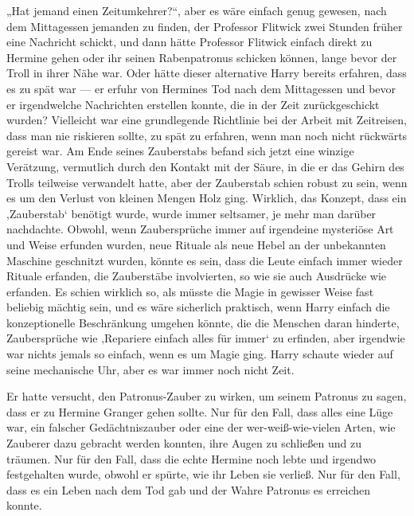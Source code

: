 „Hat jemand einen Zeitumkehrer?“, aber es wäre einfach genug gewesen, nach dem Mittagessen jemanden zu finden, der Professor Flitwick zwei Stunden früher eine Nachricht schickt, und dann hätte Professor Flitwick einfach direkt zu Hermine gehen oder ihr seinen Rabenpatronus schicken können, lange bevor der Troll in ihrer Nähe war. Oder hätte dieser alternative Harry bereits erfahren, dass es zu spät war — er erfuhr von Hermines Tod nach dem Mittagessen und bevor er irgendwelche Nachrichten erstellen konnte, die in der Zeit zurückgeschickt wurden? Vielleicht war eine grundlegende Richtlinie bei der Arbeit mit Zeitreisen, dass man nie riskieren sollte, zu spät zu erfahren, wenn man noch nicht rückwärts gereist war.
Am Ende seines Zauberstabs befand sich jetzt eine winzige Verätzung, vermutlich durch den Kontakt mit der Säure, in die er das Gehirn des Trolls teilweise verwandelt hatte, aber der Zauberstab schien robust zu sein, wenn es um den Verlust von kleinen Mengen Holz ging. Wirklich, das Konzept, dass ein ‚Zauberstab‘ benötigt wurde, wurde immer seltsamer, je mehr man darüber nachdachte. Obwohl, wenn Zaubersprüche immer auf irgendeine mysteriöse Art und Weise erfunden wurden, neue Rituale als neue Hebel an der unbekannten Maschine geschnitzt wurden, könnte es sein, dass die Leute einfach immer wieder Rituale erfanden, die Zauberstäbe involvierten, so wie sie auch Ausdrücke wie  erfanden. Es schien wirklich so, als müsste die Magie in gewisser Weise fast beliebig mächtig sein, und es wäre sicherlich praktisch, wenn Harry einfach die konzeptionelle Beschränkung umgehen könnte, die die Menschen daran hinderte, Zaubersprüche wie ‚Repariere einfach alles für immer‘ zu erfinden, aber irgendwie war nichts jemals so einfach, wenn es um Magie ging. Harry schaute wieder auf seine mechanische Uhr, aber es war immer noch nicht Zeit.

Er hatte versucht, den Patronus-Zauber zu wirken, um seinem Patronus zu sagen, dass er zu Hermine Granger gehen sollte. Nur für den Fall, dass alles eine Lüge war, ein falscher Gedächtniszauber oder eine der wer-weiß-wie-vielen Arten, wie Zauberer dazu gebracht werden konnten, ihre Augen zu schließen und zu träumen. Nur für den Fall, dass die echte Hermine noch lebte und irgendwo festgehalten wurde, obwohl er spürte, wie ihr Leben sie verließ. Nur für den Fall, dass es ein Leben nach dem Tod gab und der Wahre Patronus es erreichen konnte.

